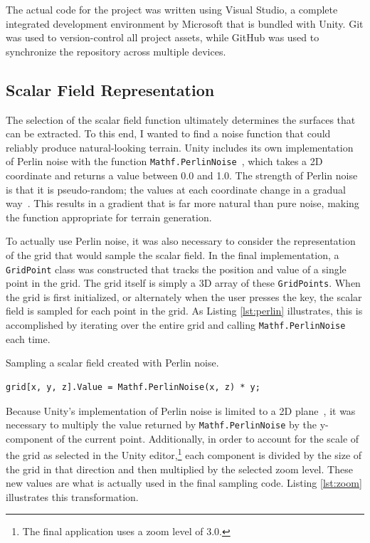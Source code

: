 \documentclass[pageno]{jpaper}
\begin{document}
The actual code for the project was written using Visual Studio, a complete integrated development environment by Microsoft that is bundled with Unity. Git was used to version-control all project assets, while GitHub was used to synchronize the repository across multiple devices.

\subsection{Scalar Field Representation}

The selection of the scalar field function ultimately determines the surfaces that can be extracted. To this end, I wanted to find a noise function that could reliably produce natural-looking terrain. Unity includes its own implementation of Perlin noise with the function \texttt{Mathf.PerlinNoise}~\cite{unityperlin}, which takes a 2D coordinate and returns a value between 0.0 and 1.0. The strength of Perlin noise is that it is pseudo-random; the values at each coordinate change in a gradual way~\cite{unityperlin}. This results in a gradient that is far more natural than pure noise, making the function appropriate for terrain generation.

To actually use Perlin noise, it was also necessary to consider the representation of the grid that would sample the scalar field. In the final implementation, a \texttt{GridPoint} class was constructed that tracks the position and value of a single point in the grid. The grid itself is simply a 3D array of these \texttt{GridPoints}. When the grid is first initialized, or alternately when the user presses the  key, the scalar field is sampled for each point in the grid. As Listing \ref{lst:perlin} illustrates, this is accomplished by iterating over the entire grid and calling \texttt{Mathf.PerlinNoise} each time.

\begin{listing}[H]
\linespread{1.0}
\caption{Sampling a scalar field created with Perlin noise.}
\begin{verbatim}
grid[x, y, z].Value = Mathf.PerlinNoise(x, z) * y;
\end{verbatim}
\label{lst:perlin}
\end{listing}

Because Unity's implementation of Perlin noise is limited to a 2D plane~\cite{unityperlin}, it was necessary to multiply the value returned by \texttt{Mathf.PerlinNoise} by the y-component of the current point. Additionally, in order to account for the scale of the grid as selected in the Unity editor,\footnote{The final application uses a zoom level of 3.0.} each component is divided by the size of the grid in that direction and then multiplied by the selected zoom level. These new values are what is actually used in the final sampling code. Listing \ref{lst:zoom} illustrates this transformation.
\end{document}
